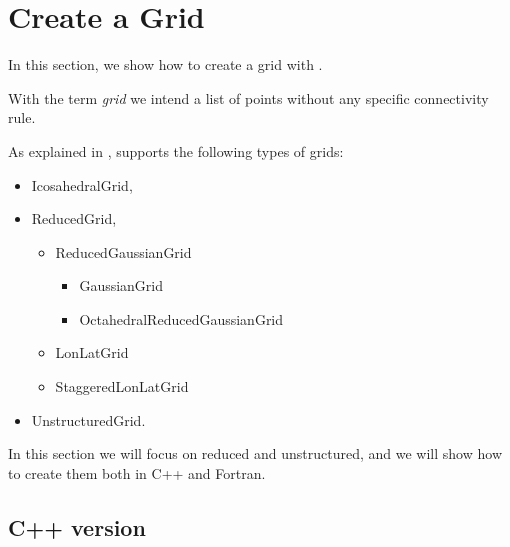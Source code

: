\chapter{Create a Grid}
In this section, we show how to create a grid with \Atlas.
% 
\begin{notebox}
With the term \textit{grid} we intend a list of points 
without any specific connectivity rule.
\end{notebox}
%
As explained in , \Atlas supports 
the following types of grids:
%
\begin{itemize}
\item IcosahedralGrid,
\item ReducedGrid,
\begin{itemize}
\item ReducedGaussianGrid
\begin{itemize}
\item GaussianGrid
\item OctahedralReducedGaussianGrid
\end{itemize}
\item LonLatGrid
\item StaggeredLonLatGrid
\end{itemize}
\item UnstructuredGrid.
\end{itemize} 
%
In this section we will focus on reduced and unstructured,
and we will show how to create them both in C++ and Fortran.



\section{C++ version}
